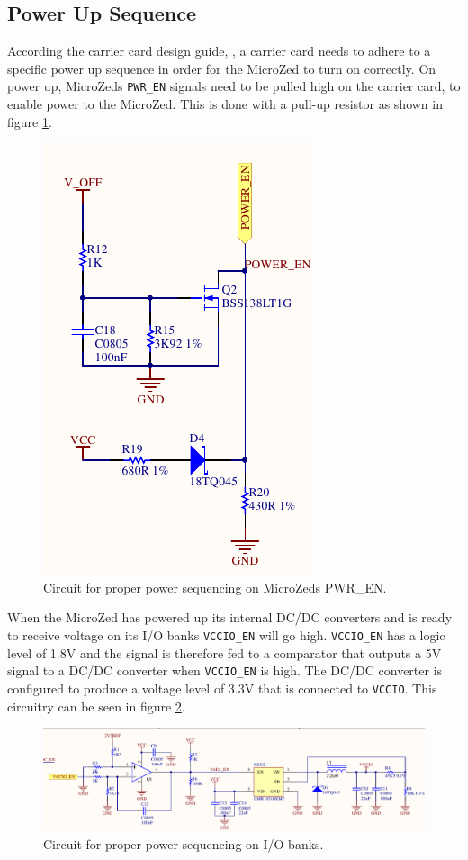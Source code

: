 \subsection{Power Up Sequence} %
\label{sub:power_up_sequence}
According the carrier card design guide, \cite{design_carrier}, a carrier card needs to adhere to a specific power up sequence in order for the MicroZed to turn on correctly.
On power up, MicroZeds \texttt{PWR\_EN} signals need to be pulled high on the carrier card, to enable power to the MicroZed.
This is done with a pull-up resistor as shown in figure \ref{fig:pwr_en_circuit}.

\begin{figure}[h]
	\centering
	\includegraphics[width=.3\linewidth]{graphics/power_en_sch.pdf}
	\caption{Circuit for proper power sequencing on MicroZeds PWR\_EN.}
	\label{fig:pwr_en_circuit}
\end{figure}

When the MicroZed has powered up its internal DC/DC converters and is ready to receive voltage on its I/O banks \texttt{VCCIO\_EN} will go high.
\texttt{VCCIO\_EN} has a logic level of 1.8V and the signal is therefore fed to a comparator that outputs a 5V signal to a DC/DC converter when \texttt{VCCIO\_EN} is high.
The DC/DC converter is configured to produce a voltage level of 3.3V that is connected to \texttt{VCCIO}.
This circuitry can be seen in figure \ref{fig:pwr_io_circuit}.

\begin{figure}[h]
	\centering
	\includegraphics[width=1\linewidth]{graphics/vccio_power_up.pdf}
	\caption{Circuit for proper power sequencing on I/O banks.}
	\label{fig:pwr_io_circuit}
\end{figure}

